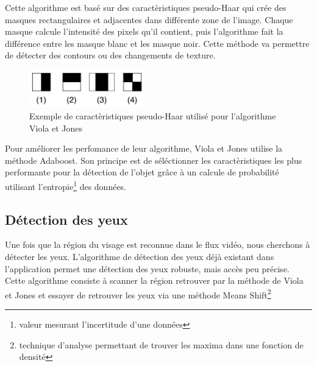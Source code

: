 Cette algorithme est basé sur des caractèristiques pseudo-Haar qui crée des masques rectangulaires et adjacentes
dans différente zone de l'image. Chaque masque calcule l'intensité des pixels qu'il contient, puis l'algorithme fait
la différence entre les masque blanc et les masque noir. Cette méthode va permettre de détecter des contours ou des changements de 
texture.\\

\begin{figure}[H]
\center
\includegraphics[width=5cm]{image/pseudo_haar.png}
\caption{Exemple de caractèristiques pseudo-Haar utilisé pour l'algorithme Viola et Jones}
\end{figure}

Pour améliorer les perfomance de leur algorithme, Viola et Jones utilise la méthode Adaboost. Son
principe est de séléctionner les caractèristiques les plus performante pour la détection de l'objet grâce à
un calcule de probabilité utilisant l'entropie\footnote{valeur mesurant l'incertitude d'une données} des données.

\subsection{Détection des yeux}
Une fois que la région du visage est reconnue dans le flux vidéo, nous cherchons à détecter les yeux. 
L'algorithme de détection des yeux déjà existant dans l'application permet une détection des yeux 
robuste, mais accès peu précise. Cette algorithme consiste à scanner la région retrouver par la 
méthode de Viola et Jones et essayer de retrouver les yeux via une méthode Means Shift\footnote{technique 
d'analyse permettant de trouver les maxima dans une fonction de densité}




